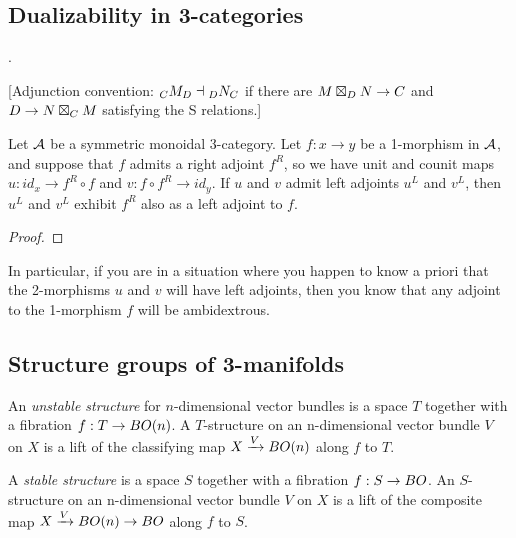 \documentclass{amsart}
\begin{document}
\subsection{Dualizability in 3-categories} \label{sec-lft-dual}
.

[Adjunction convention: ${}_{C} {M}_{D} \dashv  {}_{D} {N}_{C}$ if there are $M \boxtimes_D N \rightarrow C$ and $D \rightarrow N \boxtimes_C M$ satisfying the S relations.] 




\begin{proposition} \label{prop-ambiadjoints}
	Let $\mathcal A$ be a symmetric monoidal 3-category. Let $f: x \to y$ be a 1-morphism in $\mathcal A$, and suppose that $f$ admits a right adjoint $f^R$,  so we have unit and counit maps $u:id_x \to f^R \circ f$ and $v:f \circ f^R \to id_y$. If $u$ and $v$ admit left adjoints $u^L$ and $v^L$, then $u^L$ and $v^L$ exhibit $f^R$ also as a left adjoint to $f$. 
\end{proposition}

\begin{proof}
\end{proof}

In particular, if you are in a situation where you happen to know a priori that the 2-morphisms $u$ and $v$ will have left adjoints, then you know that any adjoint to the 1-morphism $f$ will be ambidextrous.  %

\subsection{Structure groups of 3-manifolds} \label{sec-lft-struc}

\begin{definition}
An \emph{unstable structure} for $n$-dimensional vector bundles is a space $T$ together with a fibration $f: T \rightarrow BO(n)$.  A $T$-structure on an n-dimensional vector bundle $V$ on $X$ is a lift of the classifying map $X \xrightarrow{V} BO(n)$ along $f$ to $T$.

A \emph{stable structure} is a space $S$ together with a fibration $f: S \rightarrow BO$.  An $S$-structure on an n-dimensional vector bundle $V$ on $X$ is a lift of the composite map $X \xrightarrow{V} BO(n) \rightarrow BO$ along $f$ to $S$.
\end{definition}
\end{document}
